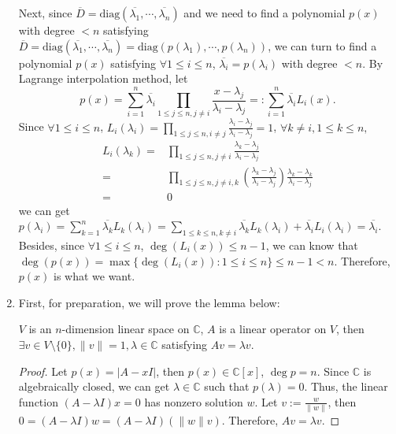 \documentclass{ctexart}
\newcommand{\diag}{\mathrm{diag}}
\newcommand{\norm}[1]{\lVert#1\rVert}
\begin{document}
\begin{solution}
\begin{enumerate}
     Next, since \(\overline{D} =\diag(\overline{\lambda_1},\cdots,\overline{\lambda_n}) \) and we need to find a polynomial \(p(x)\) with degree \(<n \) 
     satisfying \(\overline{D}=\diag(\overline{\lambda_1},\cdots,\overline{\lambda_n})=\diag(p(\lambda_1),\cdots,p(\lambda_n)) \), 
     we can turn to find a polynomial \(p(x) \) satisfying \(\forall 1 \leq i \leq n \), \(\overline{\lambda_i}=p(\lambda_i) \) with degree \(<n \). 
     By Lagrange interpolation method, let \[ p(x)=\sum_{i=1}^{n}\overline{\lambda_i}\prod_{1 \leq j \leq n, j \neq i} \frac{x-\lambda_j}{\lambda_i-\lambda_j}=:\sum_{i=1}^{n}\overline{\lambda_i}L_i(x) .\] 
     Since \(\forall 1 \leq i \leq n \), \(L_i(\lambda_i)=\prod_{1 \leq j \leq n, i \neq j}\frac{\lambda_i-\lambda_j}{\lambda_i-\lambda_j}=1 \), \( \forall k \neq i, 1 \leq k \leq n,\) 
     \[
       \begin{aligned}
         L_i(\lambda_k)=&\prod_{1 \leq j \leq n, j \neq i} \frac{\lambda_k-\lambda_j}{\lambda_i-\lambda_j}\\
         =&\prod_{1 \leq j \leq n, j \neq i,k} (\frac{\lambda_k-\lambda_j}{\lambda_i-\lambda_j}) \frac{\lambda_k-\lambda_k}{\lambda_i-\lambda_j}\\
         =&0 
       \end{aligned}
      \]
      we can get \(p(\lambda_i)=\sum_{k=1}^{n}\overline{\lambda_k}L_k(\lambda_i)=\sum_{1 \leq k \leq n, k \neq i}\overline{\lambda_k} L_k(\lambda_i) + \overline{\lambda_i}L_i(\lambda_i)=\overline{\lambda_i} \).
      Besides, since \(\forall 1 \leq i \leq n \), \( \deg(L_i(x)) \leq n -1\), we can know that \(\deg(p(x))=\max\{\deg(L_i(x)):1 \leq i \leq n\} \leq n-1 <n\). 
      Therefore, \(p(x) \) is what we want.
    \item First, for preparation, we will prove the lemma below: 
      \begin{lemma}\label{lem:normal}
        \(V \) is an \(n \)-dimension linear space on \(\mathbb{C} \), \(A \) is a linear operator on \(V \), 
        then \(\exists v \in V\setminus\{0\} , \norm{v}=1 , \lambda \in \mathbb{C}\) satisfying \(Av=\lambda v \).
      \end{lemma}
     \begin{proof}
      Let \(p(x)=|A-xI| \), then \(p(x) \in \mathbb{C}[x] \), \(\deg p =n \). Since \(\mathbb{C} \) is algebraically closed, we can get \(\lambda \in \mathbb{C}  \) such that 
       \(p(\lambda )=0 \). Thus, the linear function \((A-\lambda I)x=0 \) has nonzero solution \(w \).
       Let \(v:=\frac{w}{\norm{w}} \), then \(0=(A-\lambda I)w=(A-\lambda I)(\norm{w}v) \). Therefore, \(Av=\lambda v \).
     \end{proof}
     

\end{enumerate}
\end{solution}
\end{document}

